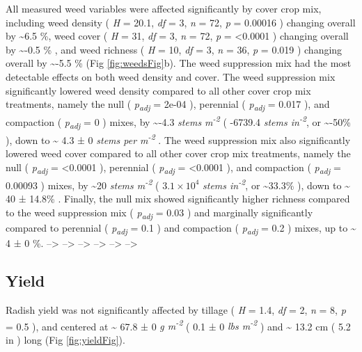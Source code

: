 \documentclass[
  12pt,
]{article}
\begin{document}
All measured weed variables were affected significantly by cover crop mix, including
weed density (
\emph{H} = 20.1,
\emph{df} = 3,
\emph{n} = 72,
\emph{p} = 0.00016
) changing overall by
\textasciitilde6.5 \%,
weed cover (
\emph{H} = 31,
\emph{df} = 3,
\emph{n} = 72,
\emph{p} = \textless0.0001
) changing overall by
\textasciitilde-0.5 \%
, and
weed richness (
\emph{H} = 10,
\emph{df} = 3,
\emph{n} = 36,
\emph{p} = 0.019
) changing overall by
\textasciitilde-5.5 \%
(Fig \ref{fig:weedsFig}b).
The weed suppression mix had the most detectable effects on both weed density and cover.
The weed suppression mix significantly lowered weed density compared to all other cover crop mix treatments, namely the null (
\emph{p\textsubscript{adj}} = 2e-04
), perennial (
\emph{p\textsubscript{adj}} = 0.017
), and compaction (
\emph{p\textsubscript{adj}} = 0
) mixes, by
\textasciitilde-4.3 \emph{stems m\textsuperscript{-2}} (
-6739.4 \emph{stems in\textsuperscript{-2}},
or \textasciitilde-50\%
), down to
\textasciitilde{} 4.3 ±
0 \emph{stems per m\textsuperscript{-2}}
.
The weed suppression mix also significantly lowered weed cover compared to all other cover crop mix treatments, namely the null (
\emph{p\textsubscript{adj}} = \textless0.0001
), perennial (
\emph{p\textsubscript{adj}} = \textless0.0001
), and compaction (
\emph{p\textsubscript{adj}} = 0.00093
) mixes, by
\textasciitilde20 \emph{stems m\textsuperscript{-2}} (
\ensuremath{3.1\times 10^{4}} \emph{stems in\textsuperscript{-2}},
or \textasciitilde33.3\%
), down to
\textasciitilde{} 40 ±
14.8\%
.
Finally, the null mix showed significantly higher richness compared to the weed suppression mix (
\emph{p\textsubscript{adj}} = 0.03
) and marginally significantly compared to perennial (
\emph{p\textsubscript{adj}} = 0.1
) and compaction (
\emph{p\textsubscript{adj}} = 0.2
) mixes,
up to
\textasciitilde{} 4 ±
0 \%.
--\textgreater{}
--\textgreater{}
--\textgreater{}
--\textgreater{}
--\textgreater{}
--\textgreater{}

\hypertarget{yield}{%
\subsection{Yield}\label{yield}}

Radish yield was not significantly affected by tillage (
\emph{H} = 1.4,
\emph{df} = 2,
\emph{n} = 8,
\emph{p} = 0.5
), and centered at
\textasciitilde{} 67.8 ±
0 \emph{g m\textsuperscript{-2}}
(
0.1 ±
0 \emph{lbs m\textsuperscript{-2}}
) and
\textasciitilde{} 13.2 cm
(
5.2 in
)
long (Fig \ref{fig:yieldFig}).
\end{document}
